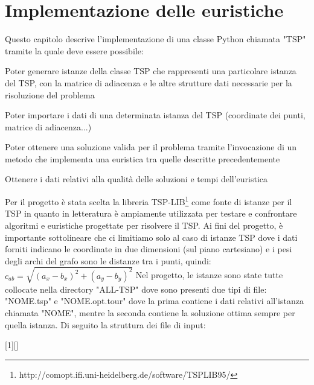\documentclass[a4paper,12pt]{report}
\begin{document}
\chapter{Implementazione delle euristiche}
Questo capitolo descrive l'implementazione di una classe Python chiamata "TSP" tramite la quale deve essere possibile:
\begin{legal}
  \item Poter generare istanze della classe TSP che rappresenti una particolare istanza del TSP, con la matrice di adiacenza e le altre strutture dati necessarie per la risoluzione del problema
  \item Poter importare i dati di una determinata istanza del TSP (coordinate dei punti, matrice di adiacenza...)
  \item Poter ottenere una soluzione valida per il problema tramite l'invocazione di un metodo che implementa una euristica tra quelle descritte precedentemente
  \item Ottenere i dati relativi alla qualità delle soluzioni e tempi dell'euristica
\end{legal}
Per il progetto è stata scelta la libreria TSP-LIB\footnote{http://comopt.ifi.uni-heidelberg.de/software/TSPLIB95/} come fonte di istanze per il TSP in quanto in letteratura è ampiamente utilizzata per testare e confrontare algoritmi e euristiche progettate per risolvere il TSP. Ai fini del progetto, è importante sottolineare che ci limitiamo solo al caso di istanze TSP dove i dati forniti indicano le coordinate in due dimensioni (sul piano cartesiano) e i pesi degli archi del grafo sono le distanze tra i punti, quindi: $c_{ab} = \sqrt{(a_x - b_x)^2 + (a_y - b_y)^2}$ Nel progetto, le istanze sono state tutte collocate nella directory "ALL-TSP" dove sono presenti due tipi di file: "NOME.tsp" e "NOME.opt.tour" dove la prima contiene i dati relativi all'istanza chiamata "NOME", mentre la seconda contiene la soluzione ottima sempre per quella istanza. Di seguito la struttura dei file di input:


[1][]{%
  \lstset{
    basicstyle=\ttfamily,
    frame=tb,
    #1
  }%
}{}
\end{document}
